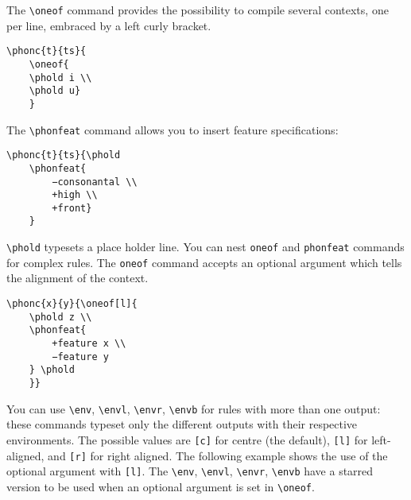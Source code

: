 \documentclass[a4paper]{article}
\begin{document}
The \verb+\oneof+ command provides the possibility to compile several contexts, one per line, embraced by a left curly bracket.

\begin{exe}
\ex
\begin{lstlisting}
\phonc{t}{ts}{
    \oneof{
    \phold i \\
    \phold u}
    }
\end{lstlisting}
\ex {}
\end{exe}

The \verb+\phonfeat+ command allows you to insert feature specifications:

\begin{exe}
\ex
\begin{lstlisting}
\phonc{t}{ts}{\phold
    \phonfeat{
        −consonantal \\
        +high \\
        +front}
    }
\end{lstlisting}
\ex {}
\end{exe}

\verb+\phold+ typesets a place holder line. You can nest \verb|oneof| and \verb|phonfeat| commands for complex rules.
The \verb|oneof| command accepts an optional argument which tells the alignment of the context.

\begin{exe}
\ex
\begin{lstlisting}
\phonc{x}{y}{\oneof[l]{
    \phold z \\
    \phonfeat{
        +feature x \\
        −feature y
    } \phold
    }}
\end{lstlisting}
\ex {}
\end{exe}

You can use \verb|\env|, \verb|\envl|, \verb|\envr|, \verb|\envb| for rules with more than one output: these commands typeset only the different outputs with their respective environments.
The possible values are \texttt{[c]} for centre (the default), \texttt{[l]} for left-aligned, and \texttt{[r]} for right aligned.
The following example shows the use of the optional argument with \texttt{[l]}.
The \verb|\env|, \verb|\envl|, \verb|\envr|, \verb|\envb| have a starred version to be used when an optional argument is set in \verb|\oneof|.
\end{document}
